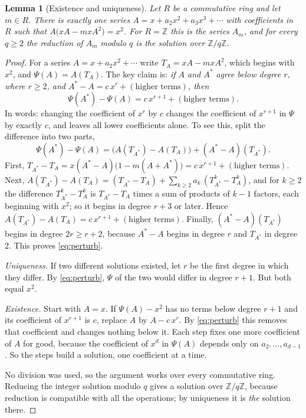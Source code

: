 \documentclass[11pt,a4paper]{article}
\newtheorem{lemma}[theorem]{Lemma}
\theoremstyle{definition}
\theoremstyle{remark}
\newcommand{\Z}{\mathbb{Z}}
\begin{document}
\begin{lemma}[Existence and uniqueness]\label{lem:exist}
Let $R$ be a commutative ring and let $m\in R$. There is exactly one series $A=x+a_2x^2+a_3x^3+\cdots$ with coefficients
in $R$ such that $A\bigl(xA-mxA^2\bigr)=x^2$. For $R=\Z$ this is the series $A_m$, and for every $q\ge2$ the reduction of
$A_m$ modulo $q$ is the solution over $\Z/q\Z$.
\end{lemma}

\begin{proof}
For a series $A=x+a_2x^2+\cdots$ write $T_A=xA-mxA^2$, which begins with $x^2$, and $\Psi(A)=A(T_A)$. The key
claim is: \emph{if $A$ and $A^*$ agree below degree $r$, where $r\ge2$, and $A^*-A=c\,x^r+(\text{higher terms})$, then
\begin{equation}\label{eq:perturb}
\Psi(A^*)-\Psi(A)=c\,x^{r+1}+(\text{higher terms}).
\end{equation}}
In words: changing the coefficient of $x^r$ by $c$ changes the coefficient of $x^{r+1}$ in $\Psi$ by exactly $c$, and
leaves all lower coefficients alone. To see this, split the difference into two parts,
\[
\Psi(A^*)-\Psi(A)=\bigl(A(T_{A^*})-A(T_A)\bigr)+(A^*-A)(T_{A^*}).
\]
First, $T_{A^*}-T_A=x(A^*-A)\bigl(1-m(A+A^*)\bigr)=c\,x^{r+1}+(\text{higher terms})$. Next,
$A(T_{A^*})-A(T_A)=(T_{A^*}-T_A)+\sum_{k\ge2}a_k\,(T_{A^*}^k-T_A^k)$, and for $k\ge2$ the difference
$T_{A^*}^k-T_A^k$ is $T_{A^*}-T_A$ times a sum of products of $k-1$ factors, each beginning with $x^2$; so it begins
in degree $r+3$ or later. Hence $A(T_{A^*})-A(T_A)=c\,x^{r+1}+(\text{higher terms})$. Finally,
$(A^*-A)(T_{A^*})$ begins in degree $2r\ge r+2$, because $A^*-A$ begins in degree $r$ and $T_{A^*}$ in degree $2$.
This proves \eqref{eq:perturb}.

\emph{Uniqueness.} If two different solutions existed, let $r$ be the first degree in which they differ. By
\eqref{eq:perturb}, $\Psi$ of the two would differ in degree $r+1$. But both equal $x^2$.

\emph{Existence.} Start with $A=x$. If $\Psi(A)-x^2$ has no terms below degree $r+1$ and its coefficient of $x^{r+1}$
is $c$, replace $A$ by $A-c\,x^r$. By \eqref{eq:perturb} this removes that coefficient and changes nothing below it.
Each step fixes one more coefficient of $A$ for good, because the coefficient of $x^d$ in $\Psi(A)$ depends only on
$a_2,\dots,a_{d-1}$. So the steps build a solution, one coefficient at a time.

No division was used, so the argument works over every commutative ring. Reducing the integer solution modulo $q$
gives a solution over $\Z/q\Z$, because reduction is compatible with all the operations; by uniqueness it is
\emph{the} solution there.
\end{proof}
\end{document}
